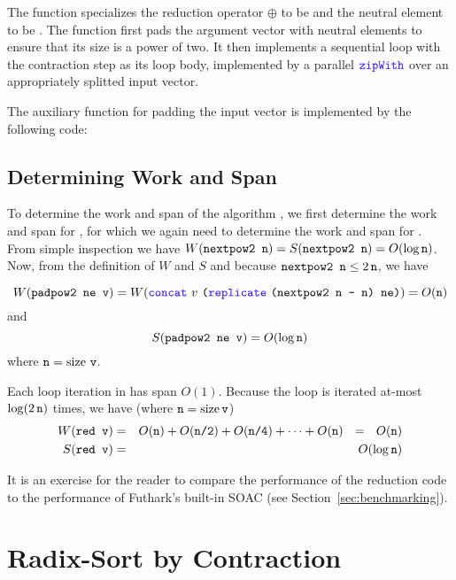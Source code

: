 \documentclass[oneside,11pt]{book}
\newcommand{\size}{\ensuremath{\mathrm{size}}}
\renewcommand{\log}{\ensuremath{\mathrm{log}}}
\newenvironment{wrap}{\vspace{\topskip}\par\noindent\begin{minipage}{\linewidth}}{\end{minipage}\par}
\begin{document}
\begin{wrap}

\end{wrap}

\noindent
The function specializes the reduction operator $\oplus$ to be \kw{+}
and the neutral element to be . The function first pads the
argument vector  with neutral elements to ensure that its size
is a power of two. It then implements a sequential loop with the
contraction step as its loop body, implemented by a
parallel $\fop{zipWith}$ over an appropriately splitted input vector.

The auxiliary function for padding the input vector is implemented by the following code:

\begin{wrap}

\end{wrap}

\subsection{Determining Work and Span}

To determine the work and span of the algorithm , we first
determine the work and span for , for which we again need
to determine the work and span for . From simple
inspection we have $W(\texttt{nextpow2 n}) = S(\texttt{nextpow2 n}) =
O(\mathrm{log}\,\texttt{n})$. Now, from the definition of $W$ and $S$ and
because $\texttt{nextpow2 n} \leq 2\,\texttt{n}$, we have

$$W(\kw{padpow2 ne v}) = W(\fop{concat}~v~\kw{(}\fop{replicate}~\kw{(nextpow2 n - n) ne)}) = O(\kw{n})$$
and
$$S(\kw{padpow2 ne v}) = O(\log\,\kw{n})$$
where $\kw{n} = \size~\kw{v}$.

Each loop iteration in  has span $O(1)$. Because the loop is
iterated at-most $\log(2\,\kw{n})$ times, we have (where $\kw{n} =
\size\,\kw{v}$)
\begin{eqnarray*}
  W(\kw{red v}) & = & O(\kw{n}) + O(\kw{n/2}) + O(\kw{n/4}) + \cdots + O(\kw{n}) ~~=~~ O(\kw{n}) \\
  S(\kw{red v}) & = & O(\log\,\kw{n})
\end{eqnarray*}

It is an exercise for the reader to compare the performance of the
reduction code to the performance of Futhark's built-in 
SOAC (see Section~\ref{sec:benchmarking}).

\section{Radix-Sort by Contraction}
\end{document}
